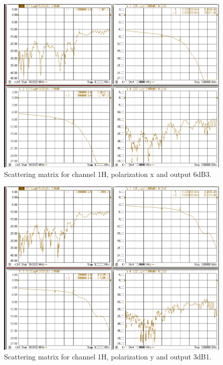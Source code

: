 \documentclass[12pt,a4paper,oneside]{article}
\begin{document}
\begin{figure}[H]
\centering
\includegraphics[width=0.9\linewidth]{VNA_results/1Hx_6dB3.png}
\caption{Scattering matrix for channel 1H, polarization x and output 6dB3.}
\label{fig:1Hx_6dB3}
\end{figure}


\begin{figure}[H]
\centering
\includegraphics[width=0.9\linewidth]{VNA_results/1Hy_3dB1.png}
\caption{Scattering matrix for channel 1H, polarization y and output 3dB1.}
\label{fig:1Hy_3dB1}
\end{figure}
\end{document}
